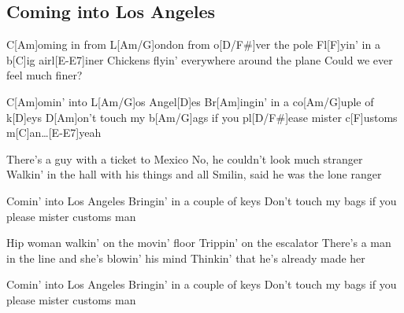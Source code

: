 \subsection*{Coming into Los Angeles   }
\begin{guitar}
C[Am]oming in from L[Am/G]ondon from o[D/F#]ver the pole
Fl[F]yin' in a b[C]ig airl[E-E7]iner
Chickens flyin' everywhere around the plane
Could we ever feel much finer?



C[Am]omin' into L[Am/G]os Angel[D]es
Br[Am]ingin' in a co[Am/G]uple of k[D]eys
D[Am]on't touch my b[Am/G]ags if you pl[D/F#]ease mister c[F]ustoms m[C]an\ldots{}[E-E7]yeah



There's a guy with a ticket to Mexico
No, he couldn't look much stranger
Walkin' in the hall with his things and all
Smilin, said he was the lone ranger



Comin' into Los Angeles
Bringin' in a couple of keys
Don't touch my bags if you please mister customs man



Hip woman walkin' on the movin' floor
Trippin' on the escalator
There's a man in the line and she's blowin' his mind
Thinkin' that he's already made her



Comin' into Los Angeles
Bringin' in a couple of keys
Don't touch my bags if you please mister customs man
\end{guitar}
